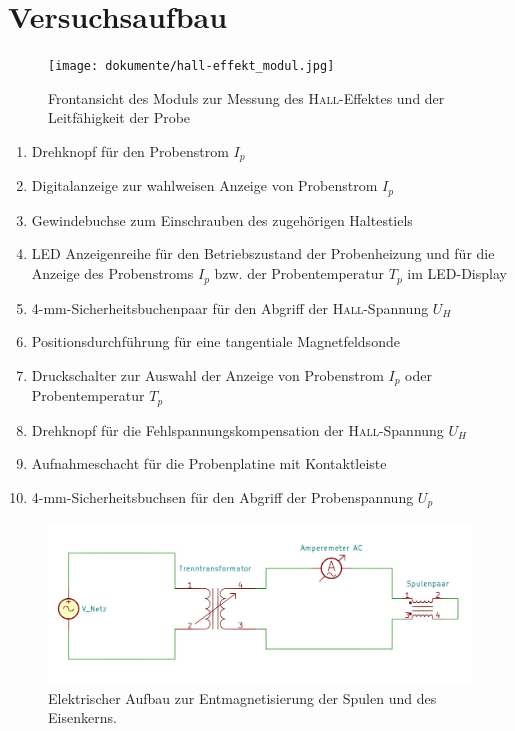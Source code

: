 \chapter{Versuchsaufbau}

\begin{figure}[h]
    \centering
    \texttt{[image: dokumente/hall-effekt\_modul.jpg]}
    \caption[Frontansicht Messmoduls]{Frontansicht des Moduls zur Messung des \textsc{Hall}-Effektes und der Leitfähigkeit der Probe \cite{PHYWESystemeGmbHundCo.KG.}}%
    \label{fig:messmodul}
\end{figure}

\begin{enumerate}
    \item Drehknopf für den Probenstrom $I_p$
    \item Digitalanzeige zur wahlweisen Anzeige von Probenstrom $I_p$
    \item Gewindebuchse zum Einschrauben des zugehörigen Haltestiels
    \item LED Anzeigenreihe für den Betriebszustand der Probenheizung und für die Anzeige des Probenstroms $I_p$ bzw. der Probentemperatur $T_p$ im LED-Display
    \item 4-mm-Sicherheitsbuchenpaar für den Abgriff der \textsc{Hall}-Spannung $U_H$
    \item Positionsdurchführung für eine tangentiale Magnetfeldsonde
    \item Druckschalter zur Auswahl der Anzeige von Probenstrom $I_p$ oder Probentemperatur $T_p$
    \item Drehknopf für die Fehlspannungskompensation der \textsc{Hall}-Spannung $U_H$
    \item Aufnahmeschacht für die Probenplatine mit Kontaktleiste
    \item 4-mm-Sicherheitsbuchsen für den Abgriff der Probenspannung $U_p$
\end{enumerate}

\begin{figure}[h]
    \centering
    \includegraphics[width=.8\textwidth]{kicad/abbildungen/schematic_entmagnetisierung.jpg}
    \caption[Schaltskizze zur Entmagnetisierung]{Elektrischer Aufbau zur Entmagnetisierung der Spulen und des Eisenkerns.}%
    \label{fig:schematicEntmag}
\end{figure}

